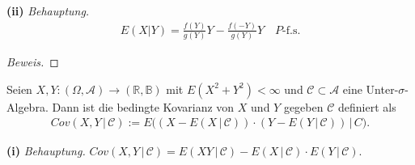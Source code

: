 \documentclass[10pt]{article}
\newcommand{\R}{\mathbb{R}}
\newcommand{\A}{\mathcal{A}}
\newcommand{\C}{\mathcal{C}}
\newcommand{\B}{\mathbb{B}}
\newcommand{\gap}{\,\vert\,}
\newcommand{\beh}{\textit{Behauptung. }}
\newenvironment{Aufgabe}[2][Aufgabe]{\begin{trivlist}
\item[\hskip \labelsep {\bfseries #1}\hskip \labelsep {\bfseries #2.}]}{\end{trivlist}}
\begin{document}
\newpage

\textbf{(ii)}
\beh \begin{align*}
	E(X|Y) = \frac{f(Y)}{g(Y)}Y - \frac{f(-Y)}{g(Y)}Y \quad{\text{$P$-f.s.}}
\end{align*}

\begin{proof}[Beweis]
	
\end{proof}

\begin{Aufgabe}{2} %
	Seien $X,Y : (\Omega,\A)\to (\R,\B)$ mit $E(X^2+Y^2) < \infty$ und $\C\subset\A$ eine Unter-$\sigma$-Algebra. Dann 
	ist die bedingte Kovarianz von $X$ und $Y$ gegeben $\C$ definiert als
	\begin{align*}
		Cov(X,Y \gap \C) := E\big( (X-E(X\gap\C)) \cdot (Y-E(Y\gap\C)) \gap C \big).
	\end{align*}
\end{Aufgabe}

\textbf{(i)}
\beh $Cov(X,Y \gap \C) = E(XY \gap \C) - E(X \gap \C) \cdot E(Y \gap \C)$.
\end{document}
